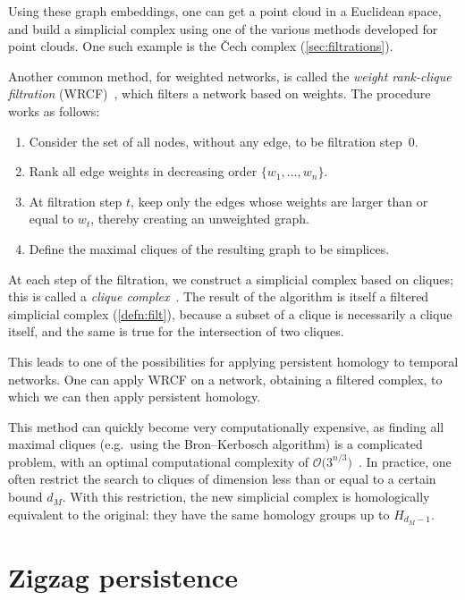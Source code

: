\documentclass[a4paper,11pt,openany,extrafontsizes]{memoir}
\begin{document}
Using these graph embeddings, one can get a point cloud in a Euclidean
space, and build a simplicial complex using one of the various methods
developed for point clouds. One such example is the Čech complex
(\autoref{sec:filtrations}).

Another common method, for weighted networks, is called the
\emph{weight rank-clique filtration}
(WRCF)~\cite{petri_topological_2013}, which filters a network based
on weights. The procedure works as follows:
\begin{enumerate}
\item Consider the set of all nodes, without any edge, to be
  filtration step~0.
\item Rank all edge weights in decreasing order $\{w_1,\ldots,w_n\}$.
\item At filtration step $t$, keep only the edges whose weights are
  larger than or equal to $w_t$, thereby creating an unweighted graph.
\item Define the maximal cliques of the resulting graph to be
  simplices.
\end{enumerate}

At each step of the filtration, we construct a simplicial complex
based on cliques; this is called a \emph{clique
  complex}~\cite{zomorodian_tidy_2010}. The result of the algorithm is
itself a filtered simplicial complex (\autoref{defn:filt}), because a
subset of a clique is necessarily a clique itself, and the same is
true for the intersection of two cliques.

This leads to one of the possibilities for applying persistent
homology to temporal networks. One can apply WRCF on a network,
obtaining a filtered complex, to which we can then apply persistent
homology.

This method can quickly become very computationally expensive, as
finding all maximal cliques (e.g.\ using the Bron--Kerbosch algorithm)
is a complicated problem, with an optimal computational complexity of
$\mathcal{O}\big(3^{n/3}\big)$~\cite{tomita_worst-case_2006}. In
practice, one often restrict the search to cliques of dimension less
than or equal to a certain bound $d_M$. With this restriction, the new
simplicial complex is homologically equivalent to the original: they
have the same homology groups up to $H_{d_M-1}$.

\section{Zigzag persistence}%
\label{sec:zigzag-persistence}
\end{document}
